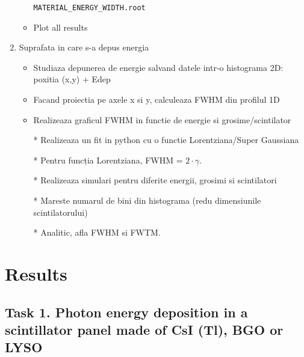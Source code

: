 \documentclass{article}
\begin{document}
\begin{enumerate}
\begin{itemize}
            \verb|MATERIAL_ENERGY_WIDTH.root|
            
            \item Plot all results
        \end{itemize}
    \item Suprafata in care s-a depus energia
        \begin{itemize}
            \item Studiaza depunerea de energie salvand datele intr-o histograma 2D: poxitia (x,y) + Edep
            \item Facand proiectia pe axele x si y, calculeaza FWHM din profilul 1D
            \item Realizeaza graficul FWHM in functie de energie si grosime/scintilator
            \item[*] Realizeaza un fit in python cu o functie Lorentziana/Super Gaussiana
            \item[*] Pentru funcția Lorentziana, FWHM = $2 \cdot \gamma$. 
            \item[*] Realizeaza simulari pentru diferite energii, grosimi si scintilatori
            \item[*] Mareste numarul de bini din histograma (redu dimensiunile scintilatorului) 
            \item[*] Analitic, afla FWHM si FWTM.
        \end{itemize}
\end{enumerate}

\newpage

\section{Results}

\subsection{Task 1. Photon energy deposition in a scintillator panel made of CsI (Tl), BGO or LYSO}
\end{document}
